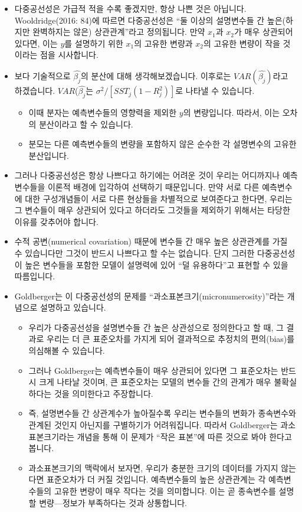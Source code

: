 \documentclass[
]{book}
\begin{document}
\begin{itemize}
\item
  다중공선성은 가급적 적을 수록 좋겠지만, 항상 나쁜 것은 아닙니다. Wooldridge(2016: 84)에 따르면 다중공선성은 ``둘 이상의 설명변수들 간 높은(하지만 완벽하지는 않은) 상관관계''라고 정의됩니다. 만약 \(x_1\)과 \(x_2\)가 매우 상관되어 있다면, 이는 \(y\)를 설명하기 위한 \(x_1\)의 고유한 변량과 \(x_2\)의 고유한 변량이 작을 것이라는 점을 시사합니다.
\item
  보다 기술적으로 \(\hat{\beta_j}\)의 분산에 대해 생각해보겠습니다. 이후로는 \(VAR(\hat{\beta_j})\)라고 하겠습니다. \(VAR\)(\(\hat{\beta_j}\)는 \(\sigma^2/[SST_j(1-R^2_j)]\)로 나타낼 수 있습니다.

  \begin{itemize}
  \item
    이때 분자는 예측변수들의 영향력을 제외한 \(y\)의 변량입니다. 따라서, 이는 오차의 분산이라고 할 수 있습니다.
  \item
    분모는 다른 예측변수들의 변량을 포함하지 않은 순수한 각 설명변수의 고유한 분산입니다.
  \end{itemize}
\item
  그러나 다중공선성은 항상 나쁘다고 하기에는 어려운 것이 우리는 어디까지나 예측변수들을 이론적 배경에 입각하여 선택하기 때문입니다. 만약 서로 다른 예측변수에 대한 구성개념들이 서로 다른 현상들을 차별적으로 보여준다고 한다면, 우리는 그 변수들이 매우 상관되어 있다고 하더라도 그것들을 제외하기 위해서는 타당한 이유를 갖추어야 합니다.
\item
  수적 공변(numerical covariation) 때문에 변수들 간 매우 높은 상관관계를 가질 수 있습니다만 그것이 반드시 나쁘다고 할 수는 없습니다. 단지 그러한 다중공선성이 높은 변수들을 포함한 모델이 설명력에 있어 ``덜 유용하다''고 표현할 수 있을 따름입니다.
\item
  Goldberger는 이 다중공선성의 문제를 ``과소표본크기(micronumerosity)''라는 개념으로 설명하고 있습니다.

  \begin{itemize}
  \item
    우리가 다중공선성을 설명변수들 간 높은 상관성으로 정의한다고 할 때, 그 결과로 우리는 더 큰 표준오차를 가지게 되어 결과적으로 추정치의 편의(bias)를 의심해볼 수 있습니다.
  \item
    그러나 Goldberger는 예측변수들이 매우 상관되어 있다면 그 표준오차는 반드시 크게 나타날 것이며, 큰 표준오차는 모델의 변수들 간의 관계가 매우 불확실하다는 것을 의미한다고 주장합니다.
  \item
    즉, 설명변수들 간 상관계수가 높아질수록 우리는 변수들의 변화가 종속변수와 관계된 것인지 아닌지를 구별하기가 어려워집니다. 따라서 Goldberger는 과소표본크기라는 개념을 통해 이 문제가 ``작은 표본''에 따른 것으로 봐야 한다고 봅니다.
  \item
    과소표본크기의 맥락에서 보자면, 우리가 충분한 크기의 데이터를 가지지 않는다면 표준오차가 더 커질 것입니다. 예측변수들의 높은 상관관계는 각 예측변수들의 고유한 변량이 매우 작다는 것을 의미합니다. 이는 곧 종속변수를 설명할 변량---정보가 부족하다는 것과 상통합니다.
  \end{itemize}
\end{itemize}
\end{document}

